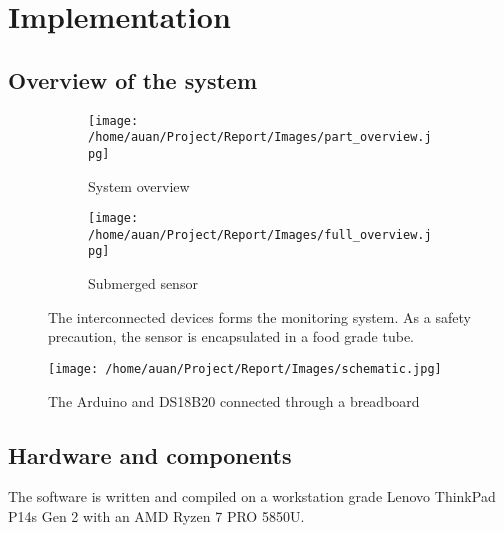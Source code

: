 \section{Implementation}%
\label{sec:implementation}

\subsection{Overview of the system}%
\label{sub:overview_of_the_system}


\begin{figure}[h]
     \centering
     \begin{subfigure}[h]{0.49\textwidth}
         \centering
         \texttt{[image: /home/auan/Project/Report/Images/part\_overview.jpg]}
         \caption{System overview}
         \label{fig:partsys}
     \end{subfigure}
     \hfill
     \begin{subfigure}[h]{0.41\textwidth}
         \centering
         \texttt{[image: /home/auan/Project/Report/Images/full\_overview.jpg]}
         \caption{Submerged sensor}
         \label{fig:fullsys}
     \end{subfigure}
        \caption{The interconnected devices forms the monitoring system. As a safety precaution, the sensor is encapsulated in a food grade tube.}
        \label{fig:three graphs}
\end{figure}


\begin{figure}[h]
  \centering
  \texttt{[image: /home/auan/Project/Report/Images/schematic.jpg]}
  \caption{The Arduino and DS18B20 connected through a breadboard}
  \label{fig:breadboard}
\end{figure}

\newpage

\subsection{Hardware and components}%
\label{sub:hardware_and_components}
The software is written and compiled on a workstation grade Lenovo ThinkPad P14s Gen 2 with an AMD Ryzen 7 PRO 5850U.

